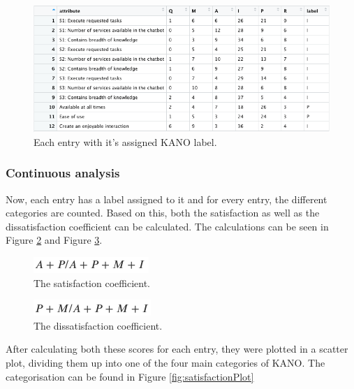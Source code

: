 \begin{figure}[!htb]
	\centering
	\includegraphics[width=\linewidth]{../LaTeX/Figures/Kano/KanoTable.png}
	\caption{Each entry with it's assigned KANO label.}
	\label{fig:kanoTable}
\end{figure}
\subsubsection{Continuous analysis}
Now, each entry has a label assigned to it and for every entry, the different categories are counted. Based on this, both the satisfaction as well as the dissatisfaction coefficient can be calculated. The calculations can be seen in Figure \ref{fig:satisfactionCoef} and Figure \ref{fig:dissatisfactionCoef}.
\begin{figure}[!htb]
	\centering
	\includegraphics{../LaTeX/Figures/Kano/SatisfactionCoef.png}
	\caption{The satisfaction coefficient.}
	\label{fig:satisfactionCoef}
\end{figure}
\begin{figure}[!htb]
	\centering
	\includegraphics{../LaTeX/Figures/Kano/DissatisfactionCoef.png}
	\caption{The dissatisfaction coefficient.}
	\label{fig:dissatisfactionCoef}
\end{figure}
\break
After calculating both these scores for each entry, they were plotted in  a scatter plot, dividing them up into one of the four main categories of KANO. The categorisation can be found in Figure \ref{fig:satisfactionPlot}
